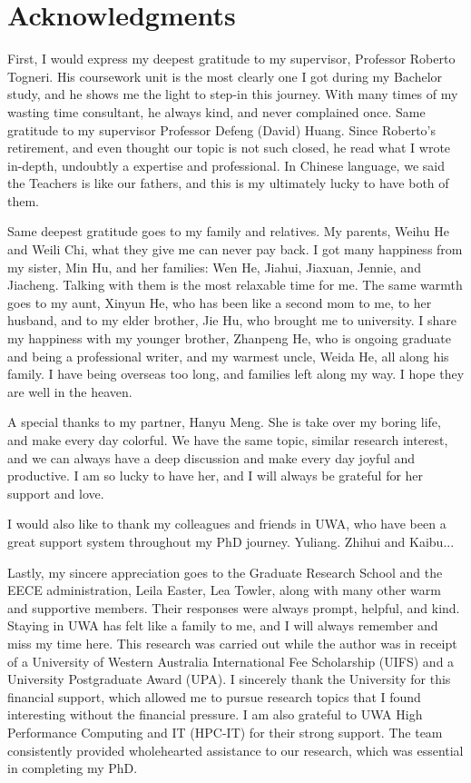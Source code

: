 \chapter*{\Large Acknowledgments}

First, I would express my deepest gratitude to my supervisor, Professor Roberto Togneri. His coursework unit is the most clearly one I got during my Bachelor study, and he shows me the light to step-in this journey. With many times of my wasting time consultant, he always kind, and never complained once. Same gratitude to my supervisor Professor Defeng (David) Huang. Since Roberto's retirement, and even thought our topic is not such closed, he read what I wrote in-depth, undoubtly a expertise and professional. In Chinese language, we said the Teachers is like our fathers, and this is my ultimately lucky to have both of them.

Same deepest gratitude goes to my family and relatives. My parents, Weihu He and Weili Chi, what they give me can never pay back. I got many happiness from my sister, Min Hu, and her families: Wen He, Jiahui, Jiaxuan, Jennie, and Jiacheng. Talking with them is the most relaxable time for me. The same warmth goes to my aunt, Xinyun He, who has been like a second mom to me, to her husband, and to my elder brother, Jie Hu, who brought me to university. I share my happiness with my younger brother, Zhanpeng He, who is ongoing graduate and being a professional writer, and my warmest uncle, Weida He, all along his family. I have being overseas too long, and families left along my way. I hope they are well in the heaven.

A special thanks to my partner, Hanyu Meng. She is take over my boring life, and make every day colorful. We have the same topic, similar research interest, and we can always have a deep discussion and make every day joyful and productive. I am so lucky to have her, and I will always be grateful for her support and love.

I would also like to thank my colleagues and friends in UWA, who have been a great support system throughout my PhD journey. Yuliang. Zhihui and Kaibu...

Lastly, my sincere appreciation goes to the Graduate Research School and the EECE administration, Leila Easter, Lea Towler, along with many other warm and supportive members. Their responses were always prompt, helpful, and kind. Staying in UWA has felt like a family to me, and I will always remember and miss my time here. This research was carried out while the author was in receipt of a University of Western Australia International Fee Scholarship (UIFS) and a University Postgraduate Award (UPA). I sincerely thank the University for this financial support, which allowed me to pursue research topics that I found interesting without the financial pressure. I am also grateful to UWA High Performance Computing and IT (HPC-IT) for their strong support. The team consistently provided wholehearted assistance to our research, which was essential in completing my PhD.